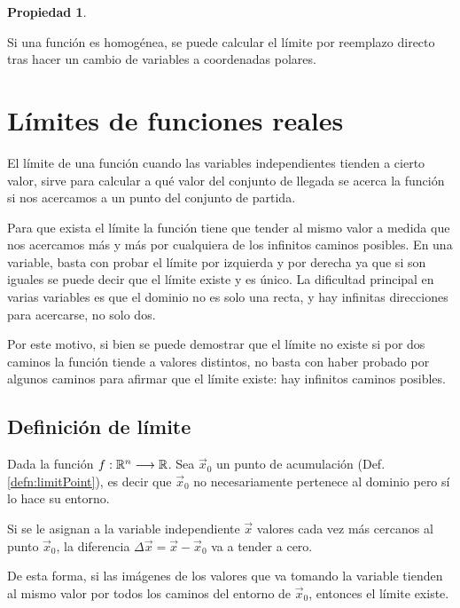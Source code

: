 \documentclass[a5paper,12pt,twoside]{book}
\newtheorem{prop}{{Propiedad}}[chapter]
\begin{document}
\begin{mdframed}[style=PropertyFrame]
    \begin{prop}
    \end{prop}
    Si una función es homogénea, se puede calcular el límite por reemplazo directo tras hacer un cambio de variables a coordenadas polares.
\end{mdframed}


\chapter{Límites de funciones reales}

El límite de una función cuando las variables independientes tienden a cierto valor, sirve para calcular a qué valor del conjunto de llegada se acerca la función si nos acercamos a un punto del conjunto de partida.

Para que exista el límite la función tiene que tender al mismo valor a medida que nos acercamos más y más por cualquiera de los infinitos caminos posibles.
En una variable, basta con probar el límite por izquierda y por derecha ya que si son iguales se puede decir que el límite existe y es único.
La dificultad principal en varias variables es que el dominio no es solo una recta, y hay infinitas direcciones para acercarse, no solo dos.

Por este motivo, si bien se puede demostrar que el límite no existe si por dos caminos la función tiende a valores distintos, no basta con haber probado por algunos caminos para afirmar que el límite existe: hay infinitos caminos posibles.


\section{Definición de límite}

Dada la función $f:\mathbb{R}^n \longrightarrow \mathbb{R}$.
Sea $\Vec{x}_0$ un punto de acumulación (Def. \ref{defn:limitPoint}), es decir que $\Vec{x}_0$ no necesariamente pertenece al dominio pero sí lo hace su entorno.

Si se le asignan a la variable independiente $\Vec{x}$ valores cada vez más cercanos al punto $\Vec{x}_0$, la diferencia $\Delta \Vec{x} = \Vec{x}-\Vec{x}_0$ va a tender a cero.

De esta forma, si las imágenes de los valores que va tomando la variable tienden al mismo valor por todos los caminos del entorno de $\Vec{x}_0$, entonces el límite existe.
\end{document}
